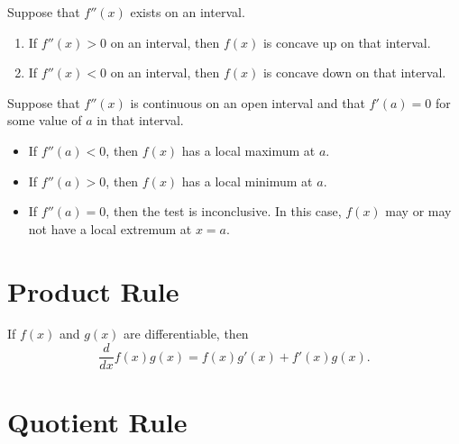 \documentclass{ximera}
\newcommand{\ddx}{\frac{d}{dx}}
\begin{document}
\begin{theorem}
Suppose that $f''(x)$ exists on an interval.
\begin{enumerate}
\item If $f''(x)>0$ on an interval, then $f(x)$ is concave up on that interval.
\item If $f''(x)<0$ on an interval, then $f(x)$ is concave down on that interval.
\end{enumerate}
\end{theorem}



\begin{theorem}\label{T:sdt}
Suppose that $f''(x)$ is continuous on an open interval and that
$f'(a)=0$ for some value of $a$ in that interval.
\begin{itemize}
\item If $f''(a) <0$, then $f(x)$ has a local maximum at $a$.
\item If $f''(a) >0$, then $f(x)$ has a local minimum at $a$.
\item If $f''(a) =0$, then the test is inconclusive. In this case,
$f(x)$ may or may not have a local extremum at $x=a$.
\end{itemize}
\end{theorem}






\section{Product Rule}





\begin{theorem}\label{theorem:product-rule}
If $f(x)$ and $g(x)$ are differentiable, then
\[
\ddx f(x)g(x) = f(x)g'(x)+f'(x)g(x).
\]
\end{theorem}







\section{Quotient Rule}
\end{document}
